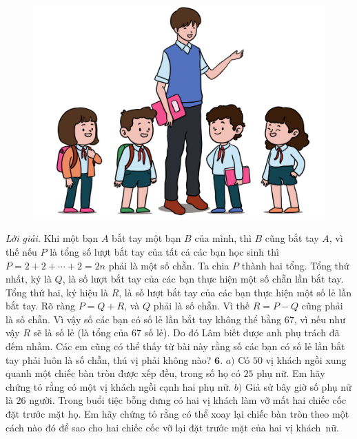 \begin{multicols}{2}
\begin{figure}[H]
		\includegraphics[width=1\linewidth]{Pi10_ToanBi_Bai5}
		\vspace*{-15pt}
	\end{figure}
	\textit{Lời giải.} 	Khi một bạn $A$ bắt tay một bạn $B$ của mình, thì $B$ cũng bắt tay $A$, vì thế nếu $P$ là tổng số lượt bắt tay của tất cả các bạn học sinh thì $P= 2+2+\cdots+2=2n$ phải là một số chẵn.
	\vskip 0.1cm
	Ta chia $P$ thành hai tổng. Tổng thứ nhất, ký là $Q$, là số lượt bắt tay của các bạn thực hiện một số chẵn lần bắt tay. Tổng thứ hai, ký hiệu là $R$, là số lượt bắt tay của các bạn thực hiện một số lẻ lần bắt tay. Rõ ràng $P= Q+R$, và $Q$ phải là số chẵn. Vì thế $R = P - Q$ cũng phải là số chẵn. Vì vậy số các bạn có số lẻ lần bắt tay không thể bằng $67$, vì nếu như vậy $R$ sẽ là số lẻ (là tổng của $67$ số lẻ). Do đó Lâm biết được anh phụ trách đã đếm nhầm. Các em cũng có thể thấy từ bài này rằng số các bạn có số lẻ lần bắt tay phải luôn là số chẵn, thú vị phải không nào?
	\vskip 0.1cm
	$\pmb{6.}$ $a)$  Có $50$ vị khách ngồi xung quanh một chiếc bàn tròn được xếp đều, trong số họ có $25$ phụ nữ. Em hãy chứng tỏ rằng có một vị khách ngồi cạnh hai phụ nữ.
	\vskip 0.1cm
	$b)$ Giả sử bây giờ số phụ nữ là $26$ người. Trong buổi tiệc bỗng dưng có hai vị khách làm vỡ mất hai chiếc cốc đặt trước mặt họ. Em hãy chứng tỏ rằng có thể xoay lại chiếc bàn tròn theo một cách nào đó để sao cho hai chiếc cốc vỡ lại đặt trước mặt của hai vị khách~nữ.
	\begin{figure}[H]
		\centering
		\vspace*{-10pt}
		\captionsetup{labelformat= empty, justification=centering}

\end{figure}
\end{multicols}
